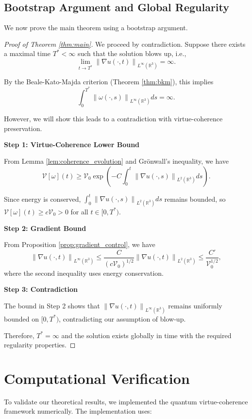 \documentclass[11pt]{article}
\newcommand{\R}{\mathbb{R}}
\newcommand{\VV}{\mathcal{V}}
\newcommand{\norm}[1]{\left\|#1\right\|}
\newcommand{\grad}{\nabla}
\begin{document}
\subsection{Bootstrap Argument and Global Regularity}

We now prove the main theorem using a bootstrap argument.

\begin{proof}[Proof of Theorem \ref{thm:main}]
We proceed by contradiction. Suppose there exists a maximal time $T^* < \infty$ such that the solution blows up, i.e.,
\[
\lim_{t \to T^*} \norm{\grad u(\cdot,t)}_{L^\infty(\R^3)} = \infty.
\]

By the Beale-Kato-Majda criterion (Theorem \ref{thm:bkm}), this implies
\[
\int_0^{T^*} \norm{\omega(\cdot,s)}_{L^\infty(\R^3)} ds = \infty.
\]

However, we will show this leads to a contradiction with virtue-coherence preservation.

\textbf{Step 1: Virtue-Coherence Lower Bound}

From Lemma \ref{lem:coherence_evolution} and Grönwall's inequality, we have
\[
\VV[\omega](t) \geq \VV_0 \exp\left(-C \int_0^t \norm{\grad u(\cdot,s)}_{L^2(\R^3)} ds\right).
\]

Since energy is conserved, $\int_0^t \norm{\grad u(\cdot,s)}_{L^2(\R^3)} ds$ remains bounded, so $\VV[\omega](t) \geq c\VV_0 > 0$ for all $t \in [0,T^*)$.

\textbf{Step 2: Gradient Bound}

From Proposition \ref{prop:gradient_control}, we have
\[
\norm{\grad u(\cdot,t)}_{L^\infty(\R^3)} \leq \frac{C}{(c\VV_0)^{1/2}} \norm{\grad u(\cdot,t)}_{L^2(\R^3)} \leq \frac{C'}{\VV_0^{1/2}},
\]
where the second inequality uses energy conservation.

\textbf{Step 3: Contradiction}

The bound in Step 2 shows that $\norm{\grad u(\cdot,t)}_{L^\infty(\R^3)}$ remains uniformly bounded on $[0,T^*)$, contradicting our assumption of blow-up.

Therefore, $T^* = \infty$ and the solution exists globally in time with the required regularity properties.
\end{proof}

\section{Computational Verification}

To validate our theoretical results, we implemented the quantum virtue-coherence framework numerically. The implementation uses:
\end{document}
